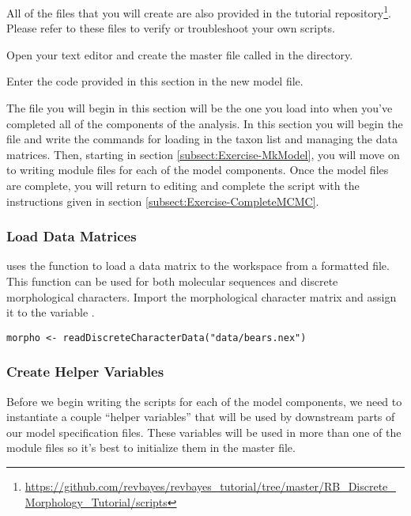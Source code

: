 All of the files that you will create are also provided in the \RevBayes tutorial repository\footnote{\url{https://github.com/revbayes/revbayes_tutorial/tree/master/RB_Discrete_Morphology_Tutorial/scripts}}. 
Please refer to these files to verify or troubleshoot your own scripts. 

{\begin{framed}
Open your text editor and create the master \Rev file called {\textcolor{red}{}} in the  directory.

Enter the \Rev code provided in this section in the new model file.
\end{framed}}

The file you will begin in this section will be the one you load into \RevBayes when you've completed all of the components of the analysis.
In this section you will begin the file and write the \Rev commands for loading in the taxon list and managing the data matrices.
Then, starting in section \ref{subsect:Exercise-MkModel}, you will move on to writing module files for each of the model components. 
Once the model files are complete, you will return to editing  and complete the \Rev script with the instructions given in section \ref{subsect:Exercise-CompleteMCMC}.

\medskip
\subsubsection{Load Data Matrices}\label{subsub:Exercise-LoadData}

\RevBayes uses the function  to load a data matrix to the workspace from a formatted file. 
This function can be used for both molecular sequences and discrete morphological characters.
Import the morphological character matrix and assign it to the variable . 
{\tt \begin{snugshade*}
\begin{lstlisting}
morpho <- readDiscreteCharacterData("data/bears.nex")
\end{lstlisting}
\end{snugshade*}}

 \medskip
\subsubsection{Create Helper Variables}\label{subsub:Exercise-mviVar}

Before we begin writing the \Rev scripts for each of the model components, we need to instantiate a couple ``helper variables'' that will be used by downstream parts of our model specification files. 
These variables will be used in more than one of the module files so it's best to initialize them in the master file.

